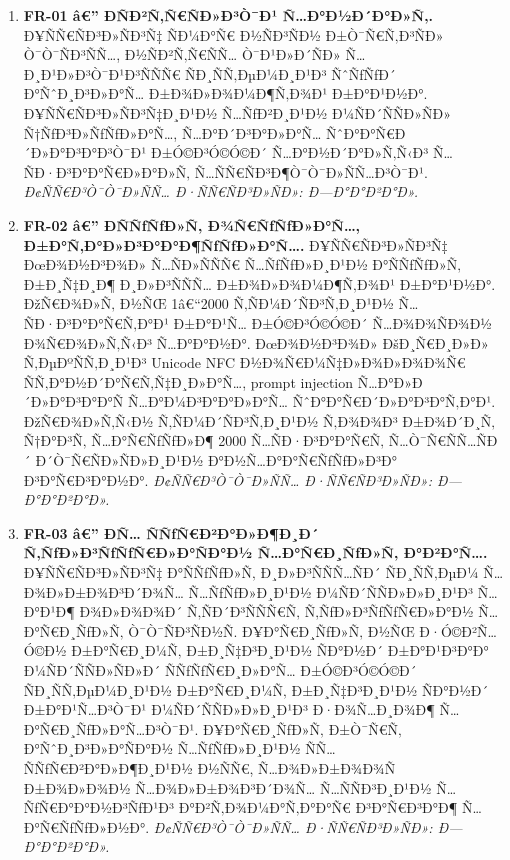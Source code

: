 \documentclass[12pt,A4]{report}
\begin{document}
\begin{enumerate}

  \item \textbf{FR-01 â€” ÐÑÐ²Ñ‚Ñ€ÑÐ»Ð³Ò¯Ð¹ Ñ…Ð°Ð½Ð´Ð°Ð»Ñ‚.}
        Ð¥ÑÑ€ÑÐ³Ð»ÑÐ³Ñ‡ ÑÐ¼Ð°Ñ€ Ð½ÑÐ³ÑÐ½ Ð±Ò¯Ñ€Ñ‚Ð³ÑÐ» Ò¯Ò¯ÑÐ³ÑÑ…, Ð½ÑÐ²Ñ‚Ñ€ÑÑ…
        Ò¯Ð¹Ð»Ð´ÑÐ» Ñ…Ð¸Ð¹Ð»Ð³Ò¯Ð¹Ð³ÑÑÑ€ ÑÐ¸ÑÑ‚ÐµÐ¼Ð¸Ð¹Ð³ ÑˆÑƒÑƒÐ´ Ð°ÑˆÐ¸Ð³Ð»Ð°Ñ…
        Ð±Ð¾Ð»Ð¾Ð¼Ð¶Ñ‚Ð¾Ð¹ Ð±Ð°Ð¹Ð½Ð°. Ð¥ÑÑ€ÑÐ³Ð»ÑÐ³Ñ‡Ð¸Ð¹Ð½ Ñ…ÑƒÐ²Ð¸Ð¹Ð½ Ð¼ÑÐ´ÑÑÐ»ÑÐ»
        Ñ†ÑƒÐ³Ð»ÑƒÑƒÐ»Ð°Ñ…, Ñ…Ð°Ð´Ð³Ð°Ð»Ð°Ñ… ÑˆÐ°Ð°Ñ€Ð´Ð»Ð°Ð³Ð°Ð³Ò¯Ð¹ Ð±Ó©Ð³Ó©Ó©Ð´
        Ñ…Ð°Ð½Ð´Ð°Ð»Ñ‚Ñ‹Ð³ Ñ…ÑÐ·Ð³Ð°Ð°Ñ€Ð»Ð°Ð»Ñ‚ Ñ…ÑÑ€ÑÐ³Ð¶Ò¯Ò¯Ð»ÑÑ…Ð³Ò¯Ð¹.
        \textit{Ð¢ÑÑ€Ð³Ò¯Ò¯Ð»ÑÑ… Ð·ÑÑ€ÑÐ³Ð»ÑÐ»: Ð—Ð°Ð°Ð²Ð°Ð».}

  \item \textbf{FR-02 â€” ÐÑÑƒÑƒÐ»Ñ‚ Ð¾Ñ€ÑƒÑƒÐ»Ð°Ñ…, Ð±Ð°Ñ‚Ð°Ð»Ð³Ð°Ð°Ð¶ÑƒÑƒÐ»Ð°Ñ….}
        Ð¥ÑÑ€ÑÐ³Ð»ÑÐ³Ñ‡ ÐœÐ¾Ð½Ð³Ð¾Ð» Ñ…ÑÐ»ÑÑÑ€ Ñ…ÑƒÑƒÐ»Ð¸Ð¹Ð½ Ð°ÑÑƒÑƒÐ»Ñ‚ Ð±Ð¸Ñ‡Ð¸Ð¶
        Ð¸Ð»Ð³ÑÑÑ… Ð±Ð¾Ð»Ð¾Ð¼Ð¶Ñ‚Ð¾Ð¹ Ð±Ð°Ð¹Ð½Ð°. ÐžÑ€Ð¾Ð»Ñ‚ Ð½ÑŒ 1â€“2000
        Ñ‚ÑÐ¼Ð´ÑÐ³Ñ‚Ð¸Ð¹Ð½ Ñ…ÑÐ·Ð³Ð°Ð°Ñ€Ñ‚Ð°Ð¹ Ð±Ð°Ð¹Ñ… Ð±Ó©Ð³Ó©Ó©Ð´ Ñ…Ð¾Ð¾ÑÐ¾Ð½
        Ð¾Ñ€Ð¾Ð»Ñ‚Ñ‹Ð³ Ñ…Ð°Ð°Ð½Ð°. ÐœÐ¾Ð½Ð³Ð¾Ð» ÐšÐ¸Ñ€Ð¸Ð»Ð» Ñ‚ÐµÐºÑÑ‚Ð¸Ð¹Ð³ Unicode
        NFC Ð½Ð¾Ñ€Ð¼Ñ‡Ð»Ð¾Ð»Ð¾Ð¾Ñ€ ÑÑ‚Ð°Ð½Ð´Ð°Ñ€Ñ‚Ñ‡Ð¸Ð»Ð°Ñ…, prompt injection
        Ñ…Ð°Ð»Ð´Ð»Ð°Ð³Ð°Ð°Ñ Ñ…Ð°Ð¼Ð³Ð°Ð°Ð»Ð°Ñ… ÑˆÐ°Ð°Ñ€Ð´Ð»Ð°Ð³Ð°Ñ‚Ð°Ð¹. ÐžÑ€Ð¾Ð»Ñ‚Ñ‹Ð½
        Ñ‚ÑÐ¼Ð´ÑÐ³Ñ‚Ð¸Ð¹Ð½ Ñ‚Ð¾Ð¾Ð³ Ð±Ð¾Ð´Ð¸Ñ‚ Ñ†Ð°Ð³Ñ‚ Ñ…Ð°Ñ€ÑƒÑƒÐ»Ð¶ 2000
        Ñ…ÑÐ·Ð³Ð°Ð°Ñ€Ñ‚ Ñ…Ò¯Ñ€ÑÑ…ÑÐ´ Ð´Ò¯Ñ€ÑÐ»ÑÐ»Ð¸Ð¹Ð½ Ð°Ð½Ñ…Ð°Ð°Ñ€ÑƒÑƒÐ»Ð³Ð° Ð³Ð°Ñ€Ð³Ð°Ð½Ð°.
        \textit{Ð¢ÑÑ€Ð³Ò¯Ò¯Ð»ÑÑ… Ð·ÑÑ€ÑÐ³Ð»ÑÐ»: Ð—Ð°Ð°Ð²Ð°Ð».}

  \item \textbf{FR-03 â€” Ð­Ñ… ÑÑƒÑ€Ð²Ð°Ð»Ð¶Ð¸Ð´ Ñ‚ÑƒÐ»Ð³ÑƒÑƒÑ€Ð»Ð°ÑÐ°Ð½ Ñ…Ð°Ñ€Ð¸ÑƒÐ»Ñ‚
        Ð°Ð²Ð°Ñ….}
        Ð¥ÑÑ€ÑÐ³Ð»ÑÐ³Ñ‡ Ð°ÑÑƒÑƒÐ»Ñ‚ Ð¸Ð»Ð³ÑÑÑ…ÑÐ´ ÑÐ¸ÑÑ‚ÐµÐ¼ Ñ…Ð¾Ð»Ð±Ð¾Ð³Ð´Ð¾Ñ…
        Ñ…ÑƒÑƒÐ»Ð¸Ð¹Ð½ Ð¼ÑÐ´ÑÑÐ»Ð»Ð¸Ð¹Ð³ Ñ…Ð°Ð¹Ð¶ Ð¾Ð»Ð¾Ð¾Ð´ Ñ‚ÑÐ´Ð³ÑÑÑ€Ñ‚
        Ñ‚ÑƒÐ»Ð³ÑƒÑƒÑ€Ð»Ð°Ð½ Ñ…Ð°Ñ€Ð¸ÑƒÐ»Ñ‚ Ò¯Ò¯ÑÐ³ÑÐ½Ñ. Ð¥Ð°Ñ€Ð¸ÑƒÐ»Ñ‚ Ð½ÑŒ Ð·Ó©Ð²Ñ…Ó©Ð½
        Ð±Ð°Ñ€Ð¸Ð¼Ñ‚ Ð±Ð¸Ñ‡Ð³Ð¸Ð¹Ð½ ÑÐ°Ð½Ð´ Ð±Ð°Ð¹Ð³Ð°Ð° Ð¼ÑÐ´ÑÑÐ»ÑÐ»Ð´ ÑÑƒÑƒÑ€Ð¸Ð»Ð°Ñ… Ð±Ó©Ð³Ó©Ó©Ð´
        ÑÐ¸ÑÑ‚ÐµÐ¼Ð¸Ð¹Ð½ Ð±Ð°Ñ€Ð¸Ð¼Ñ‚ Ð±Ð¸Ñ‡Ð³Ð¸Ð¹Ð½ ÑÐ°Ð½Ð´ Ð±Ð°Ð¹Ñ…Ð³Ò¯Ð¹ Ð¼ÑÐ´ÑÑÐ»Ð»Ð¸Ð¹Ð³
        Ð·Ð¾Ñ…Ð¸Ð¾Ð¶ Ñ…Ð°Ñ€Ð¸ÑƒÐ»Ð°Ñ…Ð³Ò¯Ð¹. Ð¥Ð°Ñ€Ð¸ÑƒÐ»Ñ‚ Ð±Ò¯Ñ€Ñ‚ Ð°ÑˆÐ¸Ð³Ð»Ð°ÑÐ°Ð½
        Ñ…ÑƒÑƒÐ»Ð¸Ð¹Ð½ ÑÑ… ÑÑƒÑ€Ð²Ð°Ð»Ð¶Ð¸Ð¹Ð½ Ð½ÑÑ€, Ñ…Ð¾Ð»Ð±Ð¾Ð¾Ñ Ð±Ð¾Ð»Ð¾Ð½
        Ñ…Ð¾Ð»Ð±Ð¾Ð³Ð´Ð¾Ñ… Ñ…ÑÑÐ³Ð¸Ð¹Ð½ Ñ…ÑƒÑ€Ð°Ð°Ð½Ð³ÑƒÐ¹Ð³ Ð°Ð²Ñ‚Ð¾Ð¼Ð°Ñ‚Ð°Ð°Ñ€ Ð³Ð°Ñ€Ð³Ð°Ð¶
        Ñ…Ð°Ñ€ÑƒÑƒÐ»Ð½Ð°.
        \textit{Ð¢ÑÑ€Ð³Ò¯Ò¯Ð»ÑÑ… Ð·ÑÑ€ÑÐ³Ð»ÑÐ»: Ð—Ð°Ð°Ð²Ð°Ð».}


\end{enumerate}
\end{document}
